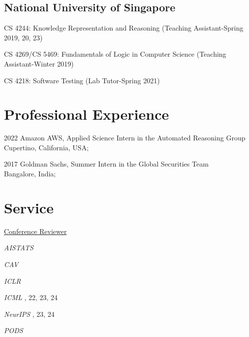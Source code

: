 \documentclass[12pt,letterpaper]{report}
\newcommand{\listitemspace}{0.15em}
\renewenvironment{itemize}
{\begin{list}{}{\setlength{\leftmargin}{0em}
			\setlength{\parskip}{0em}
			\setlength{\itemsep}{\listitemspace}
			\setlength{\parsep}{\listitemspace}}}
	{\end{list}}
\begin{document}
	\subsection*{National University of Singapore}
	
	\begin{itemize}
		
		\item   CS 4244: Knowledge Representation and Reasoning (Teaching Assistant-Spring 2019, 20, 23)
		\item   CS 4269/CS 5469: Fundamentals of Logic in Computer Science (Teaching Assistant-Winter 2019)
		\item   CS 4218: Software Testing (Lab Tutor-Spring 2021)
		
	\end{itemize}
	
	\section*{Professional Experience}
	\begin{tablist}
		\item[2022] \tab Amazon AWS, Applied Science Intern in the Automated Reasoning Group\\
		Cupertino, California, USA;
	\end{tablist}
	\begin{tablist}
		\item[2017] \tab Goldman Sachs, Summer Intern in the Global Securities Team\\
		Bangalore, India;
	\end{tablist}
	
	
	
	\section*{Service}
	\underline{Conference Reviewer }
	\vspace{1em}
	\begin{tablist}
		\item[\textit{AISTATS}] 
		\item[\textit{CAV}]  		
		\item[\textit{ICLR}] 
		\item[\textit{ICML}], 22, 23, 24
		\item[\textit{NeurIPS}] , 23, 24 
		\item[\textit{PODS}] 
	\end{tablist}
	
\end{document}
